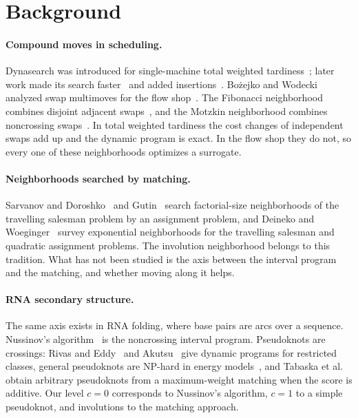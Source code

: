 \documentclass[10pt,twocolumn]{article}
\begin{document}
\section{Background}

\paragraph{Compound moves in scheduling.} Dynasearch was introduced for
single-machine total weighted tardiness~\cite{congram2002}; later work
made its search faster~\cite{ergun2006} and added
insertions~\cite{grosso2004}. Bo\.zejko and Wodecki analyzed swap
multimoves for the flow shop~\cite{bozejko2007}. The Fibonacci
neighborhood combines disjoint adjacent
swaps~\cite{fibonacci_own,bozejko2026sr}, and the Motzkin neighborhood
combines noncrossing swaps~\cite{motzkin_own}. In total weighted
tardiness the cost changes of independent swaps add up and the dynamic
program is exact. In the flow shop they do not, so every one of these
neighborhoods optimizes a surrogate.

\paragraph{Neighborhoods searched by matching.} Sarvanov and
Doroshko~\cite{sarvanov1981} and Gutin~\cite{gutin1999} search
factorial-size neighborhoods of the travelling salesman problem by an
assignment problem, and Deineko and Woeginger~\cite{deineko2000} survey
exponential neighborhoods for the travelling salesman and quadratic
assignment problems. The involution neighborhood belongs to this
tradition. What has not been studied is the axis between the interval
program and the matching, and whether moving along it helps.

\paragraph{RNA secondary structure.} The same axis exists in RNA
folding, where base pairs are arcs over a sequence. Nussinov's
algorithm~\cite{nussinov1978} is the noncrossing interval program.
Pseudoknots are crossings: Rivas and Eddy~\cite{rivas1999} and
Akutsu~\cite{akutsu2000} give dynamic programs for restricted classes,
general pseudoknots are NP-hard in energy models~\cite{lyngso2000}, and
Tabaska et al.~\cite{tabaska1998} obtain arbitrary pseudoknots from a
maximum-weight matching when the score is additive. Our level $c=0$
corresponds to Nussinov's algorithm, $c=1$ to a simple pseudoknot, and
involutions to the matching approach.
\end{document}
